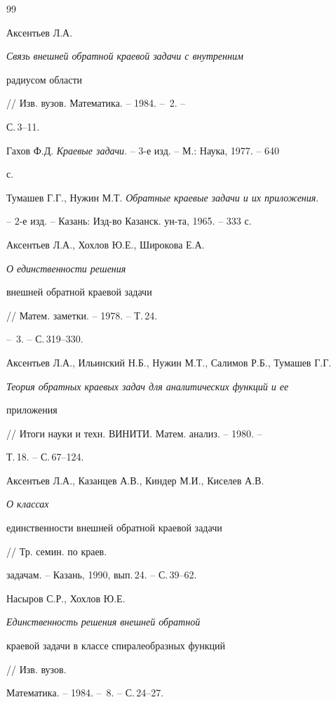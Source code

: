\begin{thebibliography}{99}







Аксентьев Л.А. {\em Связь внешней обратной краевой задачи с внутренним


радиусом области} // Изв. вузов. Математика. -- 1984. -- \No\,2. --


С.\,3--11.




Гахов Ф.Д. {\em Краевые задачи}. -- 3-е изд. -- М.: Наука, 1977. -- 640


с.




Тумашев Г.Г., Нужин М.Т. {\em Обратные краевые задачи и их приложения}.


-- 2-е изд. -- Казань: Изд-во Казанск. ун-та, 1965. -- 333 с.




Аксентьев Л.А., Хохлов Ю.Е., Широкова Е.А. {\em О единственности решения


внешней обратной краевой задачи} // Матем. заметки. -- 1978. -- Т.\,24.


-- \No\,3. -- С.\,319--330.




Аксентьев Л.А., Ильинский Н.Б., Нужин М.Т., Салимов Р.Б., Тумашев Г.Г.


{\em Теория обратных краевых задач для аналитических функций и ее


приложения} // Итоги науки и техн. ВИНИТИ. Матем. анализ. -- 1980. --


Т.\,18. -- С.\,67--124.




Аксентьев Л.А., Казанцев А.В., Киндер М.И., Киселев А.В. {\em О классах


единственности внешней обратной краевой задачи} // Тр. семин. по краев.


задачам. -- Казань, 1990, вып.\,24. -- С.\,39--62.




Насыров С.Р., Хохлов Ю.Е. {\em Единственность решения внешней обратной


краевой задачи в классе спиралеобразных функций} // Изв. вузов.


Математика. -- 1984. -- \No\,8. -- С.\,24--27.





\end{thebibliography}
